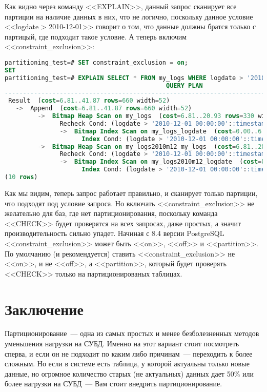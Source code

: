 Как видно через команду <<EXPLAIN>>, данный запрос сканирует все партиции на наличие данных в них, что не логично, 
поскольку данное условие <<logdate > 2010-12-01>> говорит о том, что данные должны братся только с партицый, 
где подходит такое условие. А теперь включим <<constraint\_exclusion>>:
\begin{lstlisting}[language=SQL,label=lst:partitioning15,caption=<<constraint\_exclusion>> ON]
partitioning_test=# SET constraint_exclusion = on;
SET
partitioning_test=# EXPLAIN SELECT * FROM my_logs WHERE logdate > '2010-12-01';
                                            QUERY PLAN                                             
---------------------------------------------------------------------------------------------------
 Result  (cost=6.81..41.87 rows=660 width=52)
   ->  Append  (cost=6.81..41.87 rows=660 width=52)
         ->  Bitmap Heap Scan on my_logs  (cost=6.81..20.93 rows=330 width=52)
               Recheck Cond: (logdate > '2010-12-01 00:00:00'::timestamp without time zone)
               ->  Bitmap Index Scan on my_logs_logdate  (cost=0.00..6.73 rows=330 width=0)
                     Index Cond: (logdate > '2010-12-01 00:00:00'::timestamp without time zone)
         ->  Bitmap Heap Scan on my_logs2010m12 my_logs  (cost=6.81..20.93 rows=330 width=52)
               Recheck Cond: (logdate > '2010-12-01 00:00:00'::timestamp without time zone)
               ->  Bitmap Index Scan on my_logs2010m12_logdate  (cost=0.00..6.73 rows=330 width=0)
                     Index Cond: (logdate > '2010-12-01 00:00:00'::timestamp without time zone)
(10 rows)
\end{lstlisting}

Как мы видим, теперь запрос работает правильно, и сканирует только партиции, что подходят под условие запроса.
Но включать <<constraint\_exclusion>> не желательно для баз, где нет партиционирования, 
поскольку команда <<CHECK>> будет проверятся на всех запросах, даже простых, а значит производительность сильно упадет.
Начиная с 8.4 версии PostgreSQL <<constraint\_exclusion>> может быть <<on>>, <<off>> и <<partition>>. По умолчанию 
(и рекомендуется) ставить 
<<constraint\_exclusion>> не <<on>>, и не <<off>>, а <<partition>>, который будет проверять <<CHECK>> только на 
партиционированых таблицах. 

\section{Заключение}
Партиционирование~--- одна из самых простых и менее безболезненных методов уменьшения нагрузки на СУБД. 
Именно на этот вариант стоит посмотреть сперва, и если он не подходит по каким либо причинам~--- переходить к более сложным.
Но если в системе есть таблица, у которой актуальны только новые данные, но огромное количество старых (не актуальных)
данных дает 50\% или более нагрузки на СУБД~--- Вам стоит внедрить партиционирование.